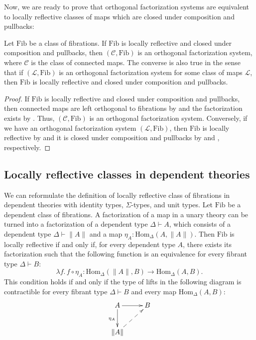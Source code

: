 \documentclass[reqno]{amsart}
\theoremstyle{definition}
\theoremstyle{remark}
\newcommand{\ob}{}
\newcommand{\fs}[1]{\mathrm{#1}}
\newcommand{\Hom}{\fs{Hom}}
\newcommand{\Fib}{\fs{Fib}}
\numberwithin{figure}{section}
\begin{document}
Now, we are ready to prove that orthogonal factorization systems are equivalent to locally reflective classes of maps which are closed under composition and pullbacks:

\begin{thm}
Let $\Fib$ be a class of fibrations.
If $\Fib$ is locally reflective and closed under composition and pullbacks, then $(\mathcal{C},\Fib)$ is an orthogonal factorization system, where $\mathcal{C}$ is the class of connected maps.
The converse is also true in the sense that if $(\mathcal{L},\Fib)$ is an orthogonal factorization system for some class of maps $\mathcal{L}$, then $\Fib$ is locally reflective and closed under composition and pullbacks.
\end{thm}
\begin{proof}
If $\Fib$ is locally reflective and closed under composition and pullbacks, then connected maps are left orthogonal to fibrations by  and the factorization exists by .
Thus, $(\mathcal{C},\Fib)$ is an orthogonal factorization system.
Conversely, if we have an orthogonal factorization system $(\mathcal{L},\Fib)$, then $\Fib$ is locally reflective by  and it is closed under composition and pullbacks by  and , respectively.
\end{proof}

\subsection{Locally reflective classes in dependent theories}

We can reformulate the definition of locally reflective class of fibrations in dependent theories with identity types, $\Sigma$-types, and unit types.
Let $\Fib$ be a dependent class of fibrations.
A factorization of a map in a unary theory can be turned into a factorization of a dependent type $\Delta \vdash A \ob$, which consists of a dependent type $\Delta \vdash \| A \| \ob$ and a map $\eta_A : \Hom_\Delta(A, \| A \|)$.
Then $\Fib$ is locally reflective if and only if, for every dependent type $A$, there exists its factorization such that the following function is an equivalence for every fibrant type $\Delta \vdash B \ob$:
\[ \lambda f.\, f \circ \eta_A : \Hom_\Delta(\| A \|, B) \to \Hom_\Delta(A, B). \]
This condition holds if and only if the type of lifts in the following diagram is contractible for every fibrant type $\Delta \vdash B \ob$ and every map $\Hom_\Delta(A,B)$:
\[ \xymatrix{ A \ar[r] \ar[d]_{\eta_A} & B \\
              \| A \| \ar@{-->}[ur]
            } \]
\end{document}
